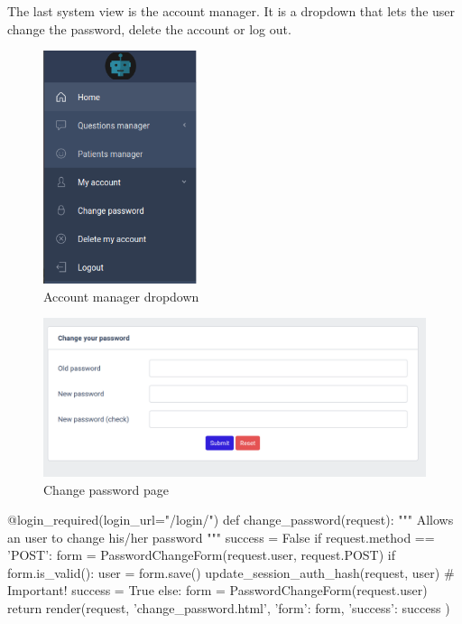 \documentclass[12pt,english]{article}
\begin{document}
The last system view is the account manager. It is a dropdown that lets the user change the password, delete the account or log out.

\begin{figure}[H]
    \centering
    \includegraphics[width=0.4\textwidth]{account_dropdown.png}
    \caption{Account manager dropdown}
\end{figure}

\begin{figure}[H]
    \centering
    \includegraphics[width=\textwidth]{change_pwd.png}
    \caption{Change password page}
\end{figure}

\begin{python}[caption={Method to change user's password}, captionpos=b]
@login_required(login_url="/login/")
def change_password(request):
    """
    Allows an user to change his/her password
    """
    success = False
    if request.method == 'POST':
        form = PasswordChangeForm(request.user, request.POST)
        if form.is_valid():
            user = form.save()
            update_session_auth_hash(request, user)  # Important!
            success = True
    else:
        form = PasswordChangeForm(request.user)
    return render(request, 'change_password.html', {
        'form': form,
        'success': success
    })
\end{python}
\end{document}
